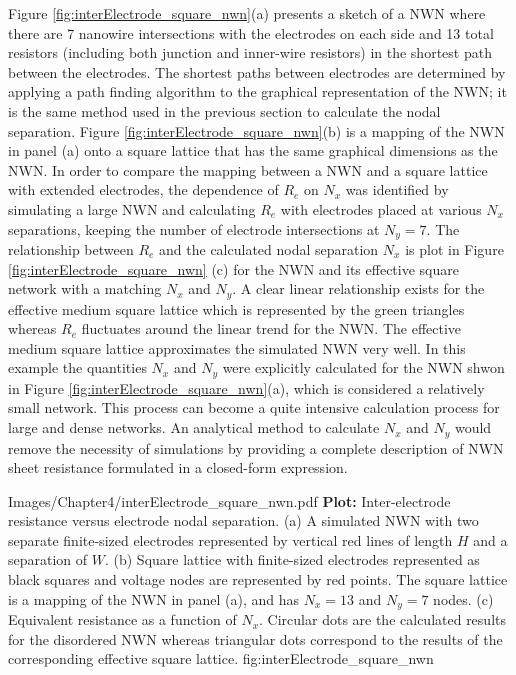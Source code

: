 Figure \ref{fig:interElectrode_square_nwn}(a) presents a sketch of a NWN where there are 7 nanowire intersections with the electrodes on each side and 13 total resistors (including both junction and inner-wire resistors) in the shortest path between the electrodes. The shortest paths between electrodes are determined by applying a path finding algorithm to the graphical representation of the NWN\cite{yen1970}; it is the same method used in the previous section to calculate the nodal separation. Figure \ref{fig:interElectrode_square_nwn}(b) is a mapping of the NWN in panel (a) onto a square lattice that has the same graphical dimensions as the NWN. In order to compare the mapping between a NWN and a square lattice with extended electrodes, the dependence of $R_e$ on $N_x$ was identified by simulating a large NWN and calculating $R_e$ with electrodes placed at various $N_x$ separations, keeping the number of electrode intersections at $N_y = 7$. The relationship between $R_e$ and the calculated nodal separation $N_x$ is plot in Figure \ref{fig:interElectrode_square_nwn} (c) for the NWN and its effective square network with a matching $N_x$ and $N_y$. A clear linear relationship exists for the effective medium square lattice which is represented by the green triangles whereas $R_e$ fluctuates around the linear trend for the NWN. The effective medium square lattice approximates the simulated NWN very well. In this example the quantities $N_x$ and $N_y$ were explicitly calculated for the NWN shwon in Figure \ref{fig:interElectrode_square_nwn}(a), which is considered a relatively small network. This process can become a quite intensive calculation process for large and dense networks. An analytical method to calculate $N_x$ and $N_y$ would remove the necessity of simulations by providing a complete description of NWN sheet resistance formulated in a closed-form expression.

{Images/Chapter4/interElectrode_square_nwn.pdf}
{\textbf{Plot:} Inter-electrode resistance versus electrode nodal separation.}
{(a) A simulated NWN with two separate finite-sized electrodes represented by vertical red lines of length $H$ and a separation of $W$. (b) Square lattice with finite-sized electrodes represented as black squares and voltage nodes are represented by red points. The square lattice is a mapping of the NWN in panel (a), and has $N_x = 13$ and $N_y = 7$ nodes. (c) Equivalent resistance as a function of $N_x$. Circular dots are the calculated results for the disordered NWN whereas triangular dots correspond to the results of the corresponding effective square lattice.}
{fig:interElectrode_square_nwn}

